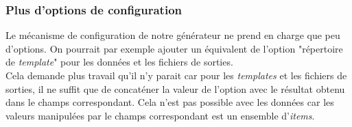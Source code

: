 		\subsubsection*{Plus d'options de configuration}
		
			Le mécanisme de configuration de notre générateur ne prend en charge que peu d'options. On pourrait par exemple ajouter un équivalent de l'option "répertoire de \textit{template}" pour les données et les fichiers de sorties.\\
			
			Cela demande plus travail qu'il n'y parait car pour les \textit{templates} et les fichiers de sorties, il ne suffit que de concaténer la valeur de l'option avec le résultat obtenu dans le champs correspondant. Cela n'est pas possible avec les données car les valeurs manipulées par le champs correspondant est un ensemble d'\textit{items}.
	
		
		